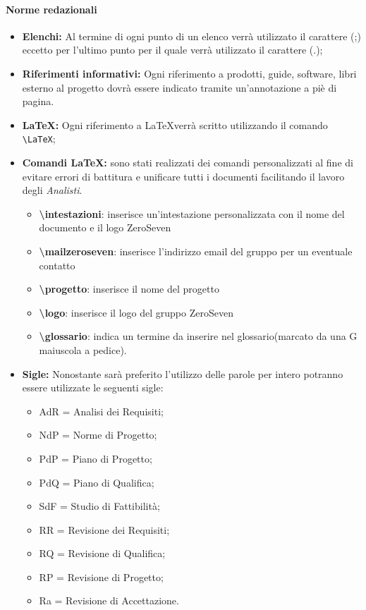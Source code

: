 \paragraph{Norme redazionali} 

\begin{itemize}
	\item \textbf{Elenchi:} Al termine di ogni punto di un elenco verrà utilizzato il carattere (;) eccetto per l'ultimo punto per il quale verrà utilizzato il carattere (.);
	\item \textbf{Riferimenti informativi:} Ogni riferimento a prodotti, guide, software,
	libri esterno al progetto dovrà essere indicato tramite un’annotazione a piè di
	pagina.
	\item \textbf{\LaTeX:} Ogni riferimento a \LaTeX  verrà scritto utilizzando il comando \texttt{\textbackslash LaTeX};
	\item \textbf{Comandi \LaTeX:} sono stati realizzati dei comandi personalizzati al fine di evitare errori di battitura e unificare tutti i documenti facilitando il lavoro degli \textit{Analisti}.
	\begin{itemize}
		\item \textbf{ \textbackslash intestazioni}: inserisce un'intestazione personalizzata con il nome del documento e il logo ZeroSeven
		\item \textbf{ \textbackslash mailzeroseven}: inserisce l'indirizzo email del gruppo per un eventuale contatto
		\item \textbf{ \textbackslash progetto}: inserisce il nome del progetto
		\item \textbf{ \textbackslash logo}: inserisce il logo del gruppo ZeroSeven
		\item \textbf{ \textbackslash glossario}: indica un termine da inserire nel glossario(marcato da una G maiuscola a pedice).	
	\end{itemize}
	
	\item \textbf{Sigle:} Nonostante sarà preferito l'utilizzo delle parole per intero potranno essere utilizzate le seguenti sigle:
	\begin{itemize}
	\item AdR = Analisi dei Requisiti;
	\item NdP = Norme di Progetto;
	\item PdP = Piano di Progetto;
	\item PdQ = Piano di Qualifica;
	\item SdF = Studio di Fattibilità;
	\item RR = Revisione dei Requisiti;
	\item RQ = Revisione di Qualifica;
	\item RP = Revisione di Progetto;
	\item Ra = Revisione di Accettazione.
	\end{itemize}
\end{itemize}
